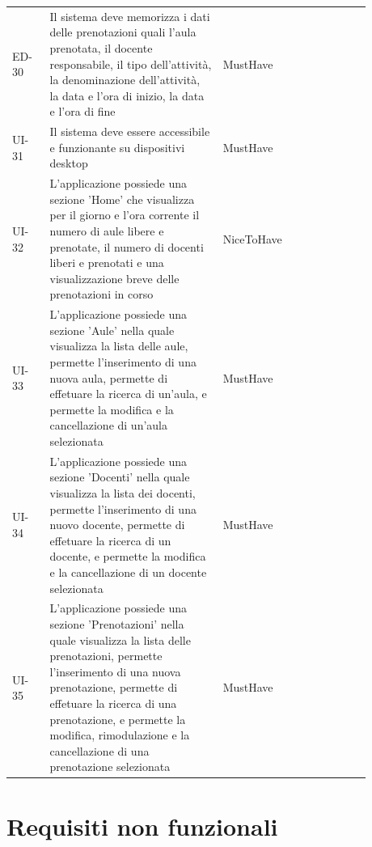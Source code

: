 \documentclass[a4paper,11pt]{article}
\begin{document}
{\begin{longtable}{@{}H{0.10\linewidth} P{0.46\linewidth} P{0.12\linewidth} P{0.20\linewidth}@{}}
ED-30 & Il sistema deve memorizza i dati delle prenotazioni quali l'aula prenotata, il docente responsabile, il tipo dell'attività, la denominazione dell'attività, la data e l'ora di inizio, la data e l'ora di fine & MustHave & \\
UI-31 & Il sistema deve essere accessibile e funzionante su dispositivi desktop & MustHave & \\
UI-32 & L'applicazione possiede una sezione 'Home' che visualizza per il giorno e l'ora corrente il numero di aule libere e prenotate, il numero di docenti liberi e prenotati e una visualizzazione breve delle prenotazioni in corso & NiceToHave & \\
UI-33 & L'applicazione possiede una sezione 'Aule' nella quale visualizza la lista delle aule, permette l'inserimento di una nuova aula, permette di effetuare la ricerca di un'aula, e permette la modifica e la cancellazione di un'aula selezionata & MustHave & \\
UI-34 & L'applicazione possiede una sezione 'Docenti' nella quale visualizza la lista dei docenti, permette l'inserimento di una nuovo docente, permette di effetuare la ricerca di un docente, e permette la modifica e la cancellazione di un docente selezionata & MustHave & \\
UI-35 & L'applicazione possiede una sezione 'Prenotazioni' nella quale visualizza la lista delle prenotazioni, permette l'inserimento di una nuova prenotazione, permette di effetuare la ricerca di una prenotazione, e permette la modifica, rimodulazione e la cancellazione di una prenotazione selezionata & MustHave & \\
\end{longtable}
}
\newpage
\section*{Requisiti non funzionali}
\end{document}
